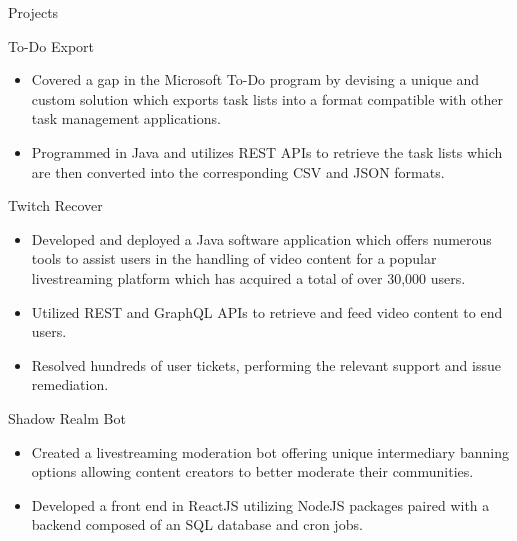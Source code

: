 \documentclass{article}
\newlength{\tabin}
\newlength{\secsep}
\newcommand{\lineunder}{\vspace*{-8pt} \\ \hspace*{-6pt} \hrulefill \\ \vspace*{-15pt}}
\newenvironment{tabbedsection}[1]{
  \begin{list}{}{
      \setlength{\itemsep}{0pt}
      \setlength{\labelsep}{0pt}
      \setlength{\labelwidth}{0pt}
      \setlength{\leftmargin}{\tabin}
      \setlength{\rightmargin}{\tabin}
      \setlength{\listparindent}{0pt}
      \setlength{\parsep}{0pt}
      \setlength{\parskip}{0pt}
      \setlength{\partopsep}{0pt}
      \setlength{\topsep}{#1}
    }
  \item[]
}{\end{list}}
\newenvironment{resume_section}[1]{
  \filbreak
  \vspace{2\secsep}
  \textsc{\large#1}
  \lineunder
  \begin{tabbedsection}{\secsep}
}{\end{tabbedsection}}
\newenvironment{resume_subsection}[2][]{
  \textbf{#2} \hfill {\normalsize #1} \hspace{-5em}
  \begin{tabbedsection}{0.5\secsep}
}{\end{tabbedsection}}
\newenvironment{subitems}{
  \renewcommand{\labelitemi}{-}
  \begin{itemize}
      \setlength{\labelsep}{1em}
}{\end{itemize}}
\begin{document}
\begin{resume_section}{Projects}
	\begin{resume_subsection}[(February 2021)]{To-Do Export}
  		\begin{subitems} 
  			\item Covered a gap in the Microsoft To-Do program by devising a unique and custom solution which exports task lists into a format compatible with other task management applications.
  			\item Programmed in Java and utilizes REST APIs to retrieve the task lists which are then converted into the corresponding CSV and JSON formats.
    		\end{subitems}
  	\end{resume_subsection}
  	\vspace{3\secsep}
	\begin{resume_subsection}{Twitch Recover}  
		\begin{subitems}
    			\item Developed and deployed a Java software application which offers numerous tools to assist users in the handling of video content for a popular livestreaming platform which has acquired a total of over 30,000 users.
    			\item Utilized REST and GraphQL APIs to retrieve and feed video content to end users.
    			\item Resolved hundreds of user tickets, performing the relevant support and issue remediation.
		\end{subitems}
	\end{resume_subsection}
	\vspace{3\secsep}
	\begin{resume_subsection}{Shadow Realm Bot}
		\begin{subitems}
			\item Created a livestreaming moderation bot offering unique intermediary banning options allowing content creators to better moderate their communities.
			\item Developed a front end in ReactJS utilizing NodeJS packages paired with a backend composed of an SQL database and cron jobs.

\end{subitems}
\end{resume_subsection}
\end{resume_section}
\end{document}
